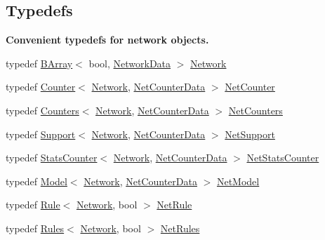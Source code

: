 \subsection*{Typedefs}
\begin{Indent}\textbf{ Convenient typedefs for network objects.}\par
\begin{DoxyCompactItemize}
\item 
typedef \hyperlink{classbarry_1_1_b_array}{B\+Array}$<$ bool, \hyperlink{classbarry_1_1counters_1_1network_1_1_network_data}{Network\+Data} $>$ \hyperlink{namespacebarry_1_1counters_1_1network_a4cb88d4572ded3b447ea269c9cd0b2c0}{Network}
\item 
typedef \hyperlink{classbarry_1_1_counter}{Counter}$<$ \hyperlink{namespacebarry_1_1counters_1_1network_a4cb88d4572ded3b447ea269c9cd0b2c0}{Network}, \hyperlink{classbarry_1_1counters_1_1network_1_1_net_counter_data}{Net\+Counter\+Data} $>$ \hyperlink{namespacebarry_1_1counters_1_1network_a067bd9de04608fc2e1586324d3864a45}{Net\+Counter}
\item 
typedef \hyperlink{classbarry_1_1_counters}{Counters}$<$ \hyperlink{namespacebarry_1_1counters_1_1network_a4cb88d4572ded3b447ea269c9cd0b2c0}{Network}, \hyperlink{classbarry_1_1counters_1_1network_1_1_net_counter_data}{Net\+Counter\+Data} $>$ \hyperlink{namespacebarry_1_1counters_1_1network_aa72fdb34752ac24167a06ee196a8fff6}{Net\+Counters}
\item 
typedef \hyperlink{classbarry_1_1_support}{Support}$<$ \hyperlink{namespacebarry_1_1counters_1_1network_a4cb88d4572ded3b447ea269c9cd0b2c0}{Network}, \hyperlink{classbarry_1_1counters_1_1network_1_1_net_counter_data}{Net\+Counter\+Data} $>$ \hyperlink{namespacebarry_1_1counters_1_1network_a4d30be7f465efd7d218f0264f8386b32}{Net\+Support}
\item 
typedef \hyperlink{classbarry_1_1_stats_counter}{Stats\+Counter}$<$ \hyperlink{namespacebarry_1_1counters_1_1network_a4cb88d4572ded3b447ea269c9cd0b2c0}{Network}, \hyperlink{classbarry_1_1counters_1_1network_1_1_net_counter_data}{Net\+Counter\+Data} $>$ \hyperlink{namespacebarry_1_1counters_1_1network_ae26c399917113fe280b3f2859376b8b9}{Net\+Stats\+Counter}
\item 
typedef \hyperlink{classbarry_1_1_model}{Model}$<$ \hyperlink{namespacebarry_1_1counters_1_1network_a4cb88d4572ded3b447ea269c9cd0b2c0}{Network}, \hyperlink{classbarry_1_1counters_1_1network_1_1_net_counter_data}{Net\+Counter\+Data} $>$ \hyperlink{namespacebarry_1_1counters_1_1network_a3ab1ee0750d4a5b0f92253874e055358}{Net\+Model}
\item 
typedef \hyperlink{classbarry_1_1_rule}{Rule}$<$ \hyperlink{namespacebarry_1_1counters_1_1network_a4cb88d4572ded3b447ea269c9cd0b2c0}{Network}, bool $>$ \hyperlink{namespacebarry_1_1counters_1_1network_afbd2c2a61931e69dd5f668c421e87a6f}{Net\+Rule}
\item 
typedef \hyperlink{classbarry_1_1_rules}{Rules}$<$ \hyperlink{namespacebarry_1_1counters_1_1network_a4cb88d4572ded3b447ea269c9cd0b2c0}{Network}, bool $>$ \hyperlink{namespacebarry_1_1counters_1_1network_adbdb20b3ce883777da2364984ea10c56}{Net\+Rules}
\end{DoxyCompactItemize}
\end{Indent}
